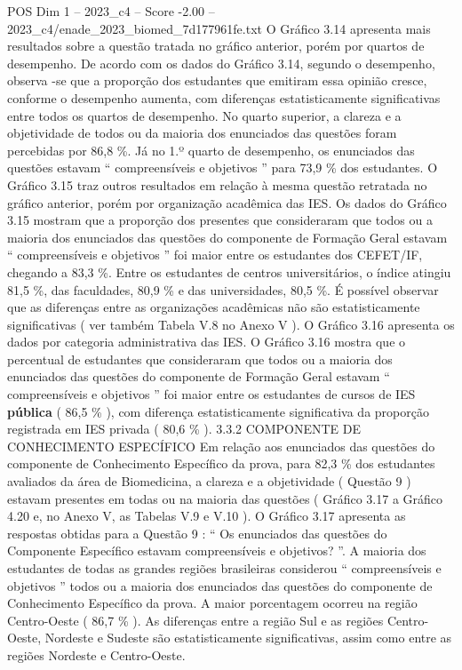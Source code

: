 \begin{textsample}{POS Dim 1 – 2023\_c4 – Score -2.00 – 2023\_c4/enade\_2023\_biomed\_7d177961fe.txt}
O Gráfico 3.14 apresenta mais resultados sobre a questão tratada no gráfico anterior, porém por quartos de desempenho.
De acordo com os dados do Gráfico 3.14, segundo o desempenho, observa -se que a proporção dos estudantes que emitiram essa opinião cresce, conforme o desempenho aumenta, com diferenças estatisticamente significativas entre todos os quartos de desempenho.
No quarto superior, a clareza e a objetividade de todos ou da maioria dos enunciados das questões foram percebidas por 86,8 \%.
Já no 1.º quarto de desempenho, os enunciados das questões estavam “ compreensíveis e objetivos ” para 73,9 \% dos estudantes.
O Gráfico 3.15 traz outros resultados em relação à mesma questão retratada no gráfico anterior, porém por organização acadêmica das IES.
Os dados do Gráfico 3.15 mostram que a proporção dos presentes que consideraram que todos ou a maioria dos enunciados das questões do componente de Formação Geral estavam “ compreensíveis e objetivos ” foi maior entre os estudantes dos CEFET/IF, chegando a 83,3 \%.
Entre os estudantes de centros universitários, o índice atingiu 81,5 \%, das faculdades, 80,9 \% e das universidades, 80,5 \%.
É possível observar que as diferenças entre as organizações acadêmicas não são estatisticamente significativas ( ver também Tabela V.8 no Anexo V ).
O Gráfico 3.16 apresenta os dados por categoria administrativa das IES.
O Gráfico 3.16 mostra que o percentual de estudantes que consideraram que todos ou a maioria dos enunciados das questões do componente de Formação Geral estavam “ compreensíveis e objetivos ” foi maior entre os estudantes de cursos de IES \textbf{pública} ( 86,5 \% ), com diferença estatisticamente significativa da proporção registrada em IES privada ( 80,6 \% ). 3.3.2 COMPONENTE DE CONHECIMENTO ESPECÍFICO Em relação aos enunciados das questões do componente de Conhecimento Específico da prova, para 82,3 \% dos estudantes avaliados da área de Biomedicina, a clareza e a objetividade ( Questão 9 ) estavam presentes em todas ou na maioria das questões ( Gráfico 3.17 a Gráfico 4.20 e, no Anexo V, as Tabelas V.9 e V.10 ).
O Gráfico 3.17 apresenta as respostas obtidas para a Questão 9 : “ Os enunciados das questões do Componente Específico estavam compreensíveis e objetivos? ”.
A maioria dos estudantes de todas as grandes regiões brasileiras considerou “ compreensíveis e objetivos ” todos ou a maioria dos enunciados das questões do componente de Conhecimento Específico da prova.
A maior porcentagem ocorreu na região Centro-Oeste ( 86,7 \% ).
As diferenças entre a região Sul e as regiões Centro-Oeste, Nordeste e Sudeste são estatisticamente significativas, assim como entre as regiões Nordeste e Centro-Oeste.

\end{textsample}
